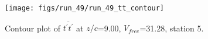 \begin{figure}[H]
\centering
\texttt{[image: figs/run\_49/run\_49\_tt\_contour]}
\caption{Contour plot of $\overline{t^\prime t^\prime}$ at $z/c$=9.00, $V_{free}$=31.28, station 5.}
\label{fig:run_49_tt_contour}
\end{figure}


